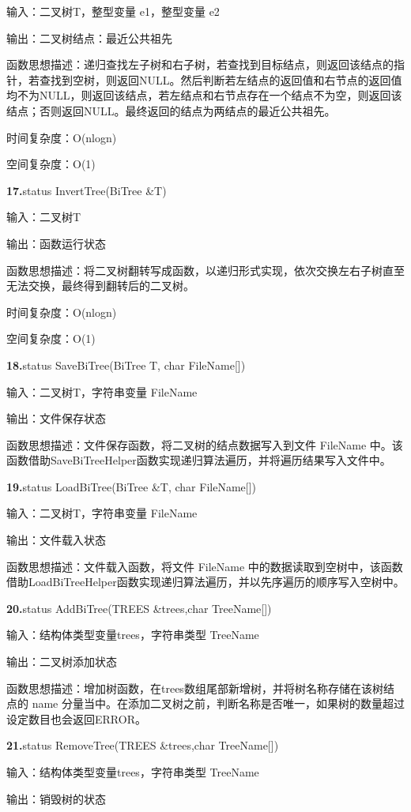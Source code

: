 \documentclass[supercite]{Experimental_Report}
\theoremstyle{definition}
\begin{document}
输入：二叉树T，整型变量 e1，整型变量 e2

输出：二叉树结点：最近公共祖先

函数思想描述：递归查找左子树和右子树，若查找到目标结点，则返回该结点的指针，若查找到空树，则返回NULL。然后判断若左结点的返回值和右节点的返回值均不为NULL，则返回该结点，若左结点和右节点存在一个结点不为空，则返回该结点；否则返回NULL。最终返回的结点为两结点的最近公共祖先。

时间复杂度：O(nlogn)

空间复杂度：O(1)

\noindent\textbf{17.}status InvertTree(BiTree \&T)

输入：二叉树T

输出：函数运行状态

函数思想描述：将二叉树翻转写成函数，以递归形式实现，依次交换左右子树直至无法交换，最终得到翻转后的二叉树。

时间复杂度：O(nlogn)

空间复杂度：O(1)

\noindent\textbf{18.}status SaveBiTree(BiTree T, char FileName[])

输入：二叉树T，字符串变量 FileName

输出：文件保存状态

函数思想描述：文件保存函数，将二叉树的结点数据写入到文件 FileName 中。该函数借助SaveBiTreeHelper函数实现递归算法遍历，并将遍历结果写入文件中。

\noindent\textbf{19.}status LoadBiTree(BiTree \&T,  char FileName[])

输入：二叉树T，字符串变量 FileName

输出：文件载入状态

函数思想描述：文件载入函数，将文件 FileName 中的数据读取到空树中，该函数借助LoadBiTreeHelper函数实现递归算法遍历，并以先序遍历的顺序写入空树中。

\noindent\textbf{20.}status AddBiTree(TREES \&trees,char TreeName[])

输入：结构体类型变量trees，字符串类型 TreeName

输出：二叉树添加状态

函数思想描述：增加树函数，在trees数组尾部新增树，并将树名称存储在该树结点的 name 分量当中。在添加二叉树之前，判断名称是否唯一，如果树的数量超过设定数目也会返回ERROR。

\noindent\textbf{21.}status RemoveTree(TREES \&trees,char TreeName[])

输入：结构体类型变量trees，字符串类型 TreeName

输出：销毁树的状态
\end{document}
